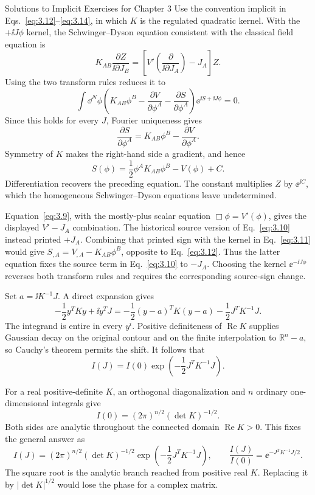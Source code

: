 \begin{bankssolutions}{Solutions to Implicit Exercises for Chapter 3}
Use the convention implicit in Eqs.~\eqref{eq:3.12}--\eqref{eq:3.14}, in
which $K$ is the regulated quadratic kernel.  With the $+\ii J\phi$ kernel, the
Schwinger--Dyson equation consistent with the classical field equation is
\[
 K_{AB}\frac{\partial Z}{\ii\partial J_B}
 =\left[V'\!\left(\frac{\partial}{\ii\partial J_A}\right)-J_A\right]Z.
\]
Using the two transform rules reduces it to
\[
 \int\dd^N\phi\left(K_{AB}\phi^B
 -\frac{\partial V}{\partial\phi^A}
 -\frac{\partial S}{\partial\phi^A}\right)
 \ee^{\ii S+\ii J\phi}=0.
\]
Since this holds for every $J$, Fourier uniqueness gives
\[
 \frac{\partial S}{\partial\phi^A}
 =K_{AB}\phi^B-\frac{\partial V}{\partial\phi^A}.
\]
Symmetry of $K$ makes the right-hand side a gradient, and hence
\[
 S(\phi)=\frac12\phi^AK_{AB}\phi^B-V(\phi)+C.
\]
Differentiation recovers the preceding equation.  The constant multiplies
$Z$ by $\ee^{\ii C}$, which the homogeneous Schwinger--Dyson equations leave
undetermined.

Equation~\eqref{eq:3.9}, with the mostly-plus scalar equation
$\Box\phi=V'(\phi)$, gives the displayed $V'-J_A$ combination.  The historical
source version of Eq.~\eqref{eq:3.10} instead printed $+J_A$.  Combining that
printed sign with the kernel in
Eq.~\eqref{eq:3.11} would give $S_{,A}=V_{,A}-K_{AB}\phi^B$, opposite to
Eq.~\eqref{eq:3.12}.  Thus the latter equation fixes the source term in
Eq.~\eqref{eq:3.10} to $-J_A$.  Choosing the kernel $\ee^{-\ii J\phi}$
reverses both transform rules and requires the corresponding source-sign
change.

Set $a=\ii K^{-1}J$.  A direct expansion gives
\[
 -\frac12y^TKy+\ii y^TJ
 =-\frac12(y-a)^TK(y-a)-\frac12J^TK^{-1}J.
\]
The integrand is entire in every $y^i$.  Positive definiteness of
$\operatorname{Re}K$ supplies Gaussian decay on the original contour and on
the finite interpolation to $\mathbb R^n-a$, so Cauchy's theorem permits the
shift.  It follows that
\[
 I(J)=I(0)\exp\!\left(-\frac12J^TK^{-1}J\right).
\]

For a real positive-definite $K$, an orthogonal diagonalization and $n$
ordinary one-dimensional integrals give
\[
 I(0)=(2\pi)^{n/2}(\det K)^{-1/2}.
\]
Both sides are analytic throughout the connected domain
$\operatorname{Re}K>0$.  This fixes the general answer as
\[
 \boxed{I(J)=(2\pi)^{n/2}(\det K)^{-1/2}
 \exp\!\left(-\frac12J^TK^{-1}J\right)},
 \qquad
 \boxed{\frac{I(J)}{I(0)}=\ee^{-J^TK^{-1}J/2}}.
\]
The square root is the analytic branch reached from positive real $K$.
Replacing it by $|\det K|^{1/2}$ would lose the phase for a complex matrix.


\end{bankssolutions}
